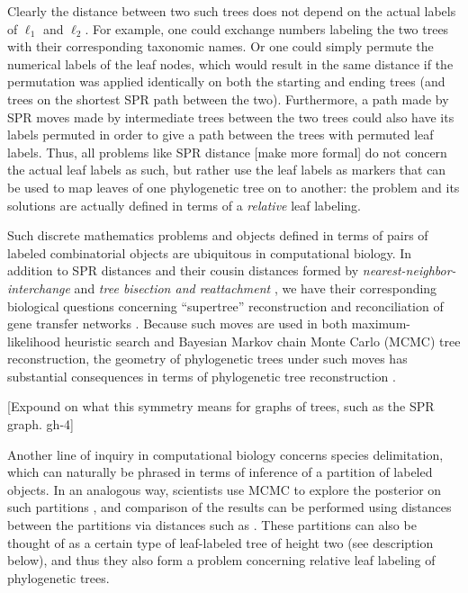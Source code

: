 \documentclass{amsart}
\begin{document}
Clearly the distance between two such trees does not depend on the actual labels of $\ell_1$ and $\ell_2$.
For example, one could exchange numbers labeling the two trees with their corresponding taxonomic names.
Or one could simply permute the numerical labels of the leaf nodes, which would result in the same distance if the permutation was applied identically on both the starting and ending trees (and trees on the shortest SPR path between the two).
Furthermore, a path made by SPR moves made by intermediate trees between the two trees could also have its labels permuted in order to give a path between the trees with permuted leaf labels.
Thus, all problems like SPR distance [make more formal] do not concern the actual leaf labels as such, but rather use the leaf labels as markers that can be used to map leaves of one phylogenetic tree on to another: the problem and its solutions are actually defined in terms of a \emph{relative} leaf labeling.

Such discrete mathematics problems and objects defined in terms of pairs of labeled combinatorial objects are ubiquitous in computational biology.
In addition to SPR distances and their cousin distances formed by \emph{nearest-neighbor-interchange} and \emph{tree bisection and reattachment} \cite{wiki:treeRearrangement}, we have their corresponding biological questions concerning ``supertree'' reconstruction \cite{Whidden2014-ku} and reconciliation of gene transfer networks \cite{Boon2013-mc}.
Because such moves are used in both maximum-likelihood heuristic search and Bayesian Markov chain Monte Carlo (MCMC) tree reconstruction, the geometry of phylogenetic trees under such moves has substantial consequences in terms of phylogenetic tree reconstruction \cite{Whidden2014-yt}.

[Expound on what this symmetry means for graphs of trees, such as the SPR graph. gh-4]

Another line of inquiry in computational biology concerns species delimitation, which can naturally be phrased in terms of inference of a partition of labeled objects.
In an analogous way, scientists use MCMC to explore the posterior on such partitions \cite{Yang2010-kc}, and comparison of the results can be performed using distances between the partitions via distances such as \cite{Gusfield2002-il}.
These partitions can also be thought of as a certain type of leaf-labeled tree of height two (see description below), and thus they also form a problem concerning relative leaf labeling of phylogenetic trees.
\end{document}
